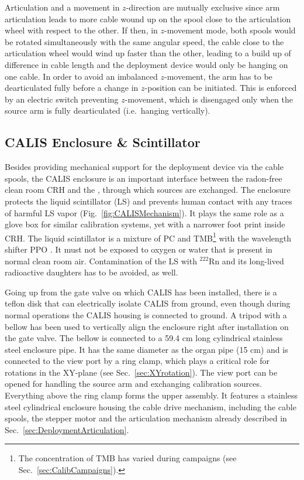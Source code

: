 Articulation and a movement in $z$-direction are mutually exclusive since arm articulation leads to more cable wound up on the spool close to the articulation wheel with respect to the other. If then, in $z$-movement mode, both spools would be rotated simultaneously with the same angular speed, the cable close to the articulation wheel would wind up faster than the other, leading to a build up of difference in cable length and the deployment device would only be hanging on one cable. In order to avoid an imbalanced $z$-movement, the arm has to be dearticulated fully before a change in $z$-position can be initiated. This is enforced by an electric switch preventing $z$-movement, which is disengaged only when the source arm is fully dearticulated (i.e.~hanging vertically). 


\subsection{CALIS Enclosure \& Scintillator}

Besides providing mechanical support for the deployment device via the cable spools, the CALIS enclosure is an important interface between the radon-free clean room CRH and the \lsv, through which sources are exchanged. 
The enclosure protects the liquid scintillator (LS) and prevents human contact with any traces of harmful LS vapor (Fig.~\ref{fig:CALISMechanism}). It plays the same role as a glove box for similar calibration systems, yet with a narrower foot print inside CRH. The liquid scintillator is a mixture of PC and TMB\footnote{The concentration of TMB has varied during campaigns (see Sec.~\ref{sec:CalibCampaigns}).} with the wavelength shifter PPO \cite{Agnes:2015qyz}. %
It must not be exposed to oxygen or water that is present in normal clean room air. Contamination of the LS with $^{222}$Rn and its long-lived radioactive daughters has to be avoided, as well. 

Going up from the gate valve on which CALIS has been installed, there is a teflon disk that can electrically isolate CALIS from ground, even though during normal operations the CALIS housing is connected to ground. A tripod with a bellow has been used to vertically align the enclosure right after installation on the gate valve. The bellow is connected to a 59.4 cm long cylindrical stainless steel enclosure pipe. It has the same diameter as the organ pipe (15 cm) and is connected to the view port by a ring clamp, which plays a critical role for rotations in the XY-plane (see Sec.~\ref{sec:XYrotation}). The view port can be opened for handling the source arm and exchanging calibration sources. Everything above the ring clamp forms the upper assembly. It features a stainless steel cylindrical enclosure housing the cable drive mechanism, including the cable spools, the stepper motor and the articulation mechanism already described in Sec.~\ref{sec:DeploymentArticulation}. 

